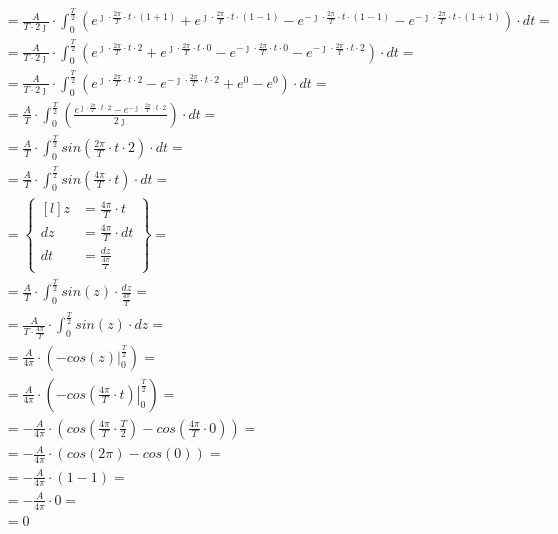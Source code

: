 \begin{task}
\begin{align*}
&=\frac{A}{T\cdot 2\jmath} \cdot \int_{0}^{\frac{T}{2}}
\left(e^{\jmath \cdot \frac{2\pi}{T} \cdot t \cdot \left(1+1\right)} + e^{\jmath \cdot \frac{2\pi}{T} \cdot t \cdot \left(1 - 1\right)} - e^{-\jmath \cdot \frac{2\pi}{T} \cdot t \cdot \left(1 -1\right)} - e^{-\jmath \cdot \frac{2\pi}{T} \cdot t \cdot \left(1+1\right)} \right) \cdot dt=\\
&=\frac{A}{T\cdot 2\jmath} \cdot \int_{0}^{\frac{T}{2}}
\left(e^{\jmath \cdot \frac{2\pi}{T} \cdot t \cdot 2} + e^{\jmath \cdot \frac{2\pi}{T} \cdot t \cdot 0} - e^{-\jmath \cdot \frac{2\pi}{T} \cdot t \cdot 0} - e^{-\jmath \cdot \frac{2\pi}{T} \cdot t \cdot 2} \right) \cdot dt=\\
&=\frac{A}{T\cdot 2\jmath} \cdot \int_{0}^{\frac{T}{2}}
\left(e^{\jmath \cdot \frac{2\pi}{T} \cdot t \cdot 2} - e^{-\jmath \cdot \frac{2\pi}{T} \cdot t \cdot 2} + e^{0} - e^{0} \right) \cdot dt=\\
&=\frac{A}{T} \cdot \int_{0}^{\frac{T}{2}}
\left( \frac{e^{\jmath \cdot \frac{2\pi}{T} \cdot t \cdot 2} - e^{-\jmath \cdot \frac{2\pi}{T} \cdot t \cdot 2}}{2\jmath} \right) \cdot dt=\\
&=\frac{A}{T} \cdot \int_{0}^{\frac{T}{2}}
sin\left( \frac{2\pi}{T} \cdot t \cdot 2 \right) \cdot dt=\\
&=\frac{A}{T} \cdot \int_{0}^{\frac{T}{2}}
sin\left( \frac{4\pi}{T} \cdot t \right) \cdot dt=\\
&=\begin{Bmatrix*}[l]
z&=\frac{4\pi}{T} \cdot t\\
dz&=\frac{4\pi}{T} \cdot dt\\
dt&=\frac{dz}{\frac{4\pi}{T}}
\end{Bmatrix*}=\\
&=\frac{A}{T} \cdot \int_{0}^{\frac{T}{2}} sin\left( z \right) \cdot \frac{dz}{\frac{4\pi}{T}}=\\
&=\frac{A}{T\cdot \frac{4\pi}{T}} \cdot \int_{0}^{\frac{T}{2}} sin\left( z \right) \cdot dz=\\
&=\frac{A}{4\pi} \cdot \left(\left. -cos\left( z \right) \right|_{0}^{\frac{T}{2}} \right)=\\
&=\frac{A}{4\pi} \cdot \left(\left. -cos\left( \frac{4\pi}{T} \cdot t \right) \right|_{0}^{\frac{T}{2}} \right)=\\
&=-\frac{A}{4\pi} \cdot \left(cos\left( \frac{4\pi}{T} \cdot \frac{T}{2} \right) -cos\left( \frac{4\pi}{T} \cdot 0 \right) \right)=\\
&=-\frac{A}{4\pi} \cdot \left(cos\left( 2\pi \right) -cos\left( 0 \right) \right)=\\
&=-\frac{A}{4\pi} \cdot \left(1 -1 \right)=\\
&=-\frac{A}{4\pi} \cdot 0=\\
&=0
\end{align*}


\end{task}
